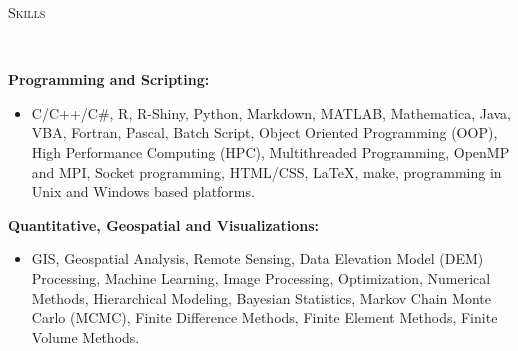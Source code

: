 \documentclass[10pt]{article}
\newenvironment{changemargin}[2]{%
  \begin{list}{}{%
 \setlength{\topsep}{0pt}%
 \setlength{\leftmargin}{#1}%
 \setlength{\rightmargin}{#2}%
 \setlength{\listparindent}{\parindent}%
 \setlength{\itemindent}{\parindent}%
 \setlength{\parsep}{\parskip}%
  }%
  \item[]}{\end{list}
}
\newcommand{\lineover}{
  \begin{changemargin}{-0.05in}{-0.05in}
  \vspace*{-8pt}
  \hrulefill \\
  \vspace*{-2pt}
  \end{changemargin}
}
\newcommand{\header}[1]{
  \begin{changemargin}{-0.5in}{-0.5in}
  \scshape{#1}\\
  \lineover
  \end{changemargin}
}
\newenvironment{body} {
  \vspace*{-2pt}
  \begin{changemargin}{-0.5in}{-0.5in}
}
{\end{changemargin}
}
\begin{document}
\medskip

\header{Skills}

\begin{body}
  \textbf{Programming and Scripting:} \\
  \vspace*{-4pt}
  \begin{itemize} \itemsep -0pt
    \item[] C/C++/C\#, R, R-Shiny, Python, Markdown, MATLAB, Mathematica, Java, VBA, Fortran, Pascal, Batch Script, Object Oriented Programming (OOP), High Performance Computing (HPC), Multithreaded Programming,  OpenMP and MPI, Socket programming, HTML/CSS, \LaTeX, make, programming in Unix and Windows based platforms.\\
  \end{itemize}

  \textbf{Quantitative, Geospatial and Visualizations:} \\
  \vspace*{-4pt}
  \begin{itemize} \itemsep -0pt
    \item[] GIS, Geospatial Analysis, Remote Sensing, Data Elevation Model (DEM) Processing, Machine Learning, Image Processing, Optimization, Numerical Methods, Hierarchical Modeling, Bayesian Statistics, Markov Chain Monte Carlo (MCMC), Finite Difference Methods, Finite Element Methods, Finite Volume Methods. \\
  \end{itemize}

\end{body}
\end{document}
